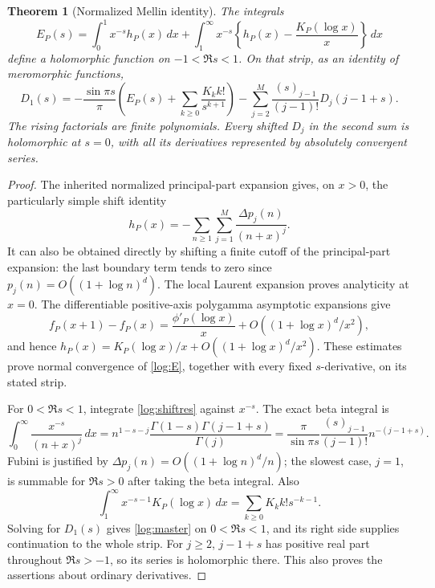 \documentclass[11pt,letterpaper]{article}
\numberwithin{equation}{section}
\theoremstyle{plain}
\newtheorem{theorem}{Theorem}[section]
\theoremstyle{definition}
\theoremstyle{remark}
\begin{document}
\begin{theorem}[Normalized Mellin identity]
\label{log:Mellin}
The integrals
\begin{equation}\label{log:E}
 E_P(s)=\int_0^1 x^{-s}h_P(x)\,dx
  +\int_1^\infty x^{-s}
       \left\{h_P(x)-\frac{K_P(\log x)}x\right\}\,dx
\end{equation}
define a holomorphic function on $-1<\Re s<1$.
On that strip, as an identity of meromorphic functions,
\begin{equation}\label{log:master}
 \boxed{\displaystyle
 D_1(s)=-\frac{\sin\pi s}{\pi}
       \left(E_P(s)+\sum_{k\ge0}\frac{K_k k!}{s^{k+1}}\right)
 -\sum_{j=2}^M\frac{(s)_{j-1}}{(j-1)!}D_j(j-1+s).}
\end{equation}
The rising factorials are finite polynomials.
Every shifted $D_j$ in the second sum is holomorphic at $s=0$,
with all its derivatives represented by absolutely convergent series.
\end{theorem}

\begin{proof}
The inherited normalized principal-part expansion \cite[Section 2]{DPL}
gives, on
$x>0$, the particularly simple shift identity
\begin{equation}\label{log:shiftres}
 h_P(x)=-\sum_{n\ge1}\sum_{j=1}^M
          \frac{\Delta p_j(n)}{(n+x)^j}.
\end{equation}
It can also be obtained directly by shifting a finite cutoff of the
principal-part expansion: the last boundary term tends to zero since
$p_j(n)=O((1+\log n)^d)$.
The local Laurent expansion proves analyticity at $x=0$.
The differentiable positive-axis polygamma asymptotic expansions give
\[
 f_P(x+1)-f_P(x)=\frac{\phi'_P(\log x)}x
                   +O((1+\log x)^d/x^2),
\]
and hence
$h_P(x)=K_P(\log x)/x+O((1+\log x)^d/x^2)$.
These estimates prove normal convergence of \eqref{log:E}, together
with every fixed $s$-derivative, on its stated strip.

For $0<\Re s<1$, integrate \eqref{log:shiftres} against $x^{-s}$.
The exact beta integral is
\[
 \int_0^\infty\frac{x^{-s}}{(n+x)^j}\,dx
 =n^{1-s-j}\frac{\Gamma(1-s)\Gamma(j-1+s)}{\Gamma(j)}
 =\frac{\pi}{\sin\pi s}\frac{(s)_{j-1}}{(j-1)!}
   n^{-(j-1+s)}.
\]
Fubini is justified by
$\Delta p_j(n)=O((1+\log n)^d/n)$; the slowest case, $j=1$,
is summable for $\Re s>0$ after taking the beta integral.
Also
\[
 \int_1^\infty x^{-s-1}K_P(\log x)\,dx
       =\sum_{k\ge0}K_k k!s^{-k-1}.
\]
Solving for $D_1(s)$ gives \eqref{log:master} on $0<\Re s<1$,
and its right side supplies continuation to the whole strip.
For $j\ge2$, $j-1+s$ has positive real part throughout
$\Re s>-1$, so its series is holomorphic there. This also proves
the assertions about ordinary derivatives.
\end{proof}
\end{document}
